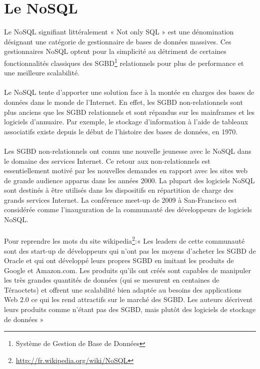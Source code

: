 \section{Le NoSQL}

Le NoSQL signifiant littéralement « \textsf{Not only SQL} » est une
dénomination désignant une catégorie de gestionnaire de bases de
données massives. Ces gestionnaires \textsf{NoSQL} optent pour la
simplicité au détriment de certaines fonctionnalités classiques des
\textsf{SGBD}\footnote{Système de Gestion de Base de Données}
relationnels pour plus de performance et une meilleure
scalabilité.\\\\ Le \textsf{NoSQL} tente d'apporter une solution face
à la montée en charges des bases de données dans le monde de
l'\textsf{Internet}. En effet, les \textsf{SGBD} non-relationnels sont
plus anciens que les \textsf{SGBD} relationnels et sont répandus sur
les mainframes et les logiciels d'annuaire. Par exemple, le stockage
d'information à l'aide de tableaux associatifs existe depuis le début
de l'histoire des bases de données, en 1970.  \\ \\ Les \textsf{SGBD}
non-relationnels ont connu une nouvelle jeunesse avec le
\textsf{NoSQL} dans le domaine des services \textsf{Internet}. Ce
retour aux non-relationnels est essentiellement motivé par les
nouvelles demandes en rapport avec les sites web de grande audience
apparus dans les années 2000. La plupart des logiciels \textsf{NoSQL}
sont destinés à être utilisés dans les dispositifs en répartition de
charge des grands services \textsf{Internet}. La conférence meet-up de
2009 à \textsf{San-Francisco} est considérée comme l'inauguration de
la communauté des développeurs de logiciels \textsf{NoSQL}.\\\\ Pour
reprendre les mots du site
\textsf{wikipedia}\footnote{\url{http://fr.wikipedia.org/wiki/NoSQL}}:«
  Les leaders de cette communauté sont des start-up de développeurs
  qui n'ont pas les moyens d'acheter les SGBD de Oracle et qui ont
  développé leurs propres SGBD en imitant les produits de Google et
  Amazon.com. Les produits qu'ils ont créés sont capables de manipuler
  les très grandes quantités de données (qui se mesurent en centaines
  de Téraoctets) et offrent une scalabilité bien adaptée au besoins
  des applications Web 2.0 ce qui les rend attractifs sur le marché
  des SGBD. Les auteurs décrivent leurs produits comme n'étant pas des
  SGBD, mais plutôt des logiciels de stockage de données »
 
